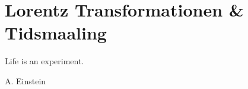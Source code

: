 \chapter{Lorentz Transformationen \& Tidsmaaling}
\label{sec:Tidsmaaling}
\epigraph{Life is an experiment.}{A. Einstein}
\minitoc
\clearpage

\lipsum